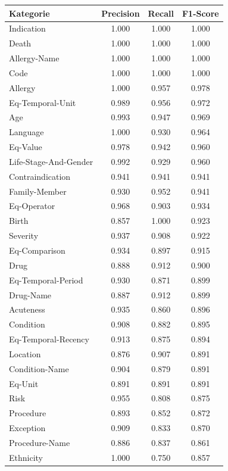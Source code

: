 \begin{table}[htbp]
\centering
\begin{tabular}{p{5cm}ccc}
\toprule
\textbf{Kategorie} & \textbf{Precision} & \textbf{Recall} & \textbf{F1-Score} \\
\midrule
Indication & 1.000 & 1.000 & 1.000 \\
Death & 1.000 & 1.000 & 1.000 \\
Allergy-Name & 1.000 & 1.000 & 1.000 \\
Code & 1.000 & 1.000 & 1.000 \\
Allergy & 1.000 & 0.957 & 0.978 \\
Eq-Temporal-Unit & 0.989 & 0.956 & 0.972 \\
Age & 0.993 & 0.947 & 0.969 \\
Language & 1.000 & 0.930 & 0.964 \\
Eq-Value & 0.978 & 0.942 & 0.960 \\
Life-Stage-And-Gender & 0.992 & 0.929 & 0.960 \\
Contraindication & 0.941 & 0.941 & 0.941 \\
Family-Member & 0.930 & 0.952 & 0.941 \\
Eq-Operator & 0.968 & 0.903 & 0.934 \\
Birth & 0.857 & 1.000 & 0.923 \\
Severity & 0.937 & 0.908 & 0.922 \\
Eq-Comparison & 0.934 & 0.897 & 0.915 \\
Drug & 0.888 & 0.912 & 0.900 \\
Eq-Temporal-Period & 0.930 & 0.871 & 0.899 \\
Drug-Name & 0.887 & 0.912 & 0.899 \\
Acuteness & 0.935 & 0.860 & 0.896 \\
Condition & 0.908 & 0.882 & 0.895 \\
Eq-Temporal-Recency & 0.913 & 0.875 & 0.894 \\
Location & 0.876 & 0.907 & 0.891 \\
Condition-Name & 0.904 & 0.879 & 0.891 \\
Eq-Unit & 0.891 & 0.891 & 0.891 \\
Risk & 0.955 & 0.808 & 0.875 \\
Procedure & 0.893 & 0.852 & 0.872 \\
Exception & 0.909 & 0.833 & 0.870 \\
Procedure-Name & 0.886 & 0.837 & 0.861 \\
Ethnicity & 1.000 & 0.750 & 0.857 \\

\end{tabular}
\end{table}
